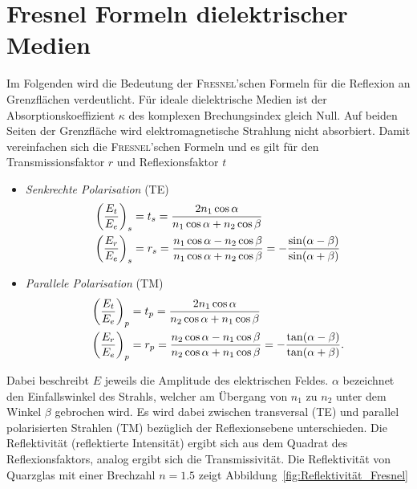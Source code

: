 \documentclass[a4paper,twoside,final]{article}
\begin{document}
\section{Fresnel Formeln dielektrischer Medien}\label{sec:Anhang}
Im Folgenden wird die Bedeutung der \textsc{Fresnel}'schen Formeln für die Reflexion an Grenzflächen verdeutlicht. Für ideale dielektrische Medien ist der Absorptionskoeffizient $\kappa$ des komplexen Brechungsindex gleich Null. Auf beiden Seiten der Grenzfläche wird elektromagnetische Strahlung nicht absorbiert. Damit vereinfachen sich die \textsc{Fresnel}'schen Formeln und es gilt für den Transmissionsfaktor $r$ und Reflexionsfaktor $t$~\cite{Demtroeder2}
\begin{itemize}
  \item \emph{Senkrechte Polarisation} (TE)
  \begin{align}
    \qty(\frac{E_t}{E_e})_s &= t_s = \frac{2 n_1 \cos \alpha}{n_1 \cos\alpha + n_2 \cos \beta}\\
    \qty(\frac{E_r}{E_e})_s &= r_s = \frac{n_1 \cos\alpha - n_2 \cos\beta}{n_1 \cos\alpha + n_2 \cos \beta} = -\frac{\sin(\alpha -\beta)}{\sin(\alpha + \beta)}
  \end{align}
  \item \emph{Parallele Polarisation} (TM)
  \begin{align}
    \qty(\frac{E_t}{E_e})_p &= t_p = \frac{2 n_1 \cos \alpha}{n_2 \cos\alpha + n_1 \cos \beta}\\
    \qty(\frac{E_r}{E_e})_p &= r_p = \frac{n_2 \cos\alpha - n_1 \cos\beta}{n_2 \cos\alpha + n_1 \cos \beta} = -\frac{\tan(\alpha -\beta)}{\tan(\alpha + \beta)}.\label{eqn:Parallele_Polarisation}
  \end{align}
\end{itemize}
Dabei beschreibt $E$ jeweils die Amplitude des elektrischen Feldes. $\alpha$ bezeichnet den Einfallswinkel des Strahls, welcher am Übergang von $n_1$ zu $n_2$ unter dem Winkel $\beta$ gebrochen wird.
Es wird dabei zwischen transversal (TE) und parallel polarisierten Strahlen (TM) bezüglich der Reflexionsebene unterschieden. Die Reflektivität (reflektierte Intensität) ergibt sich aus dem Quadrat des Reflexionsfaktors, analog ergibt sich die Transmissivität. Die Reflektivität von Quarzglas mit einer Brechzahl $n = 1.5$ zeigt Abbildung~\ref{fig:Reflektivität_Fresnel}


\end{document}
